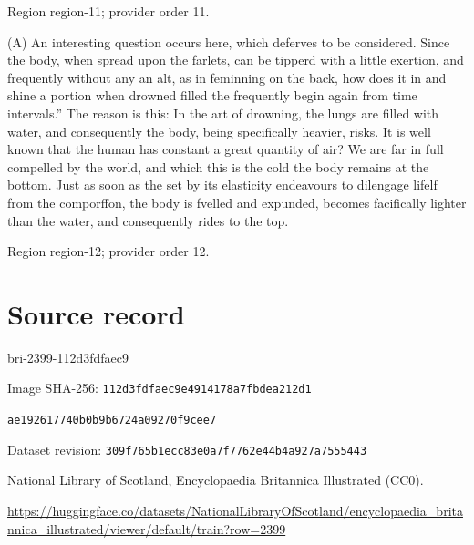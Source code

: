 \documentclass[11pt]{article}
\begin{document}
{\scriptsize\color{gray} Region region-11; provider order 11.\par}
\medskip

(A) An interesting question occurs here, which deferves to be considered. Since the body, when spread upon the farlets, can be tipperd with a little exertion, and frequently without any an alt, as in feminning on the back, how does it in and shine a portion when drowned filled the frequently begin again from time intervals.” The reason is this: In the art of drowning, the lungs are filled with water, and consequently the body, being specifically heavier, risks. It is well known that the human has constant a great quantity of air? We are far in full compelled by the world, and which this is the cold the body remains at the bottom. Just as soon as the set by its elasticity endeavours to dilengage lifelf from the comporffon, the body is fvelled and expunded, becomes facifically lighter than the water, and consequently rides to the top.
\par

{\scriptsize\color{gray} Region region-12; provider order 12.\par}
\medskip
\newpage\section*{Source record}
bri-2399-112d3fdfaec9\par
Image SHA-256: \texttt{112d3fdfaec9e4914178a7fbdea212d1}\par\texttt{ae192617740b0b9b6724a09270f9cee7}\par
Dataset revision: \texttt{309f765b1ecc83e0a7f7}\texttt{762e44b4a927a7555443}\par
National Library of Scotland, Encyclopaedia Britannica Illustrated (CC0).\par
\url{https://huggingface.co/datasets/NationalLibraryOfScotland/encyclopaedia_britannica_illustrated/viewer/default/train?row=2399}
\end{document}
